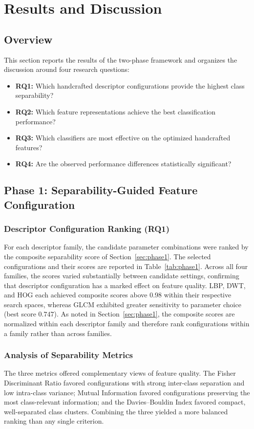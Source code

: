 \section{Results and Discussion}
\label{sec:results}

\subsection{Overview}

This section reports the results of the two-phase framework and organizes the
discussion around four research questions:
\begin{itemize}
\item \textbf{RQ1:} Which handcrafted descriptor configurations provide the
highest class separability?
\item \textbf{RQ2:} Which feature representations achieve the best classification
performance?
\item \textbf{RQ3:} Which classifiers are most effective on the optimized
handcrafted features?
\item \textbf{RQ4:} Are the observed performance differences statistically
significant?
\end{itemize}

\subsection{Phase 1: Separability-Guided Feature Configuration}

\subsubsection{Descriptor Configuration Ranking (RQ1)}
For each descriptor family, the candidate parameter combinations were ranked by
the composite separability score of Section~\ref{sec:phase1}. The selected
configurations and their scores are reported in Table~\ref{tab:phase1}. Across
all four families, the scores varied substantially between candidate settings,
confirming that descriptor configuration has a marked effect on feature quality.
LBP, DWT, and HOG each achieved composite scores above $0.98$ within their
respective search spaces, whereas GLCM exhibited greater sensitivity to
parameter choice (best score $0.747$). As noted in Section~\ref{sec:phase1}, the
composite scores are normalized within each descriptor family and therefore rank
configurations within a family rather than across families.

\subsubsection{Analysis of Separability Metrics}
The three metrics offered complementary views of feature quality. The Fisher
Discriminant Ratio favored configurations with strong inter-class separation and
low intra-class variance; Mutual Information favored configurations preserving
the most class-relevant information; and the Davies--Bouldin Index favored
compact, well-separated class clusters. Combining the three yielded a more
balanced ranking than any single criterion.

